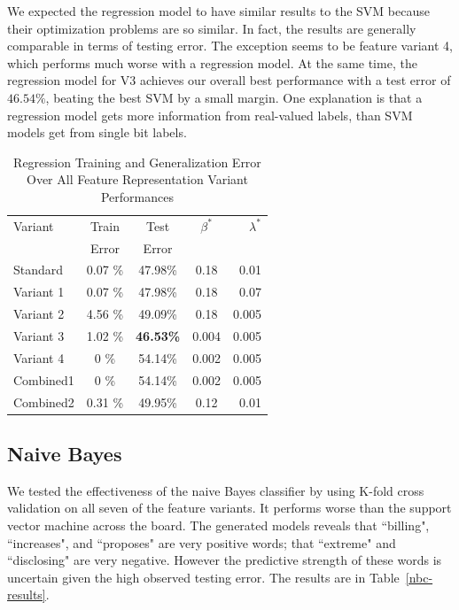 \documentclass{article}
\begin{document}
We expected the regression model to have similar results to the SVM because their optimization problems are so similar. In fact, the results are generally comparable in terms of testing error. The exception seems to be feature variant 4, which performs much worse with a regression model. At the same time, the regression model for V3 achieves our overall best performance with a test error of $46.54\%$, beating the best SVM by a small margin. One explanation is that a regression model gets more information from real-valued labels, than SVM models get from single bit labels.

\begin{table}[b]
\caption{Regression Training and Generalization Error Over All Feature Representation Variant Performances}
\label{reg-feature-experiment}
\vskip 0.15in
\begin{center}
\begin{small}
\begin{sc}
\begin{tabular}{lcccr}
\hline
\abovespace\belowspace
Variant & Train & Test & $\beta^*$ & $\lambda^*$ \\
\ & Error & Error \\
\hline
\abovespace
Standard     & 0.07 \% & 47.98\% & 0.18 & 0.01\\ %
Variant 1    & 0.07 \% & 47.98\% & 0.18 & 0.07\\ 
Variant 2    & 4.56 \% & 49.09\% & 0.18 & 0.005\\ 
Variant 3    & 1.02 \% & {\bf46.53\%} & 0.004 & 0.005\\ 
Variant 4    & 0 \% & 54.14\% & 0.002 & 0.005\\ 
Combined1    & 0 \% & 54.14\% & 0.002 & 0.005\\ 
\belowspace
Combined2    & 0.31 \% & 49.95\% & 0.12 & 0.01\\ 
\hline
\end{tabular}
\end{sc}
\end{small}
\end{center}
\vskip -0.1in
\end{table}


\subsection{Naive Bayes}
We tested the effectiveness of the naive Bayes classifier by using K-fold cross validation on all seven of the feature variants. It performs worse than the support vector machine across the board. The generated models reveals that ``billing", ``increases", and ``proposes" are very positive words; that ``extreme" and ``disclosing" are very negative. However the predictive strength of these words is uncertain given the high observed testing error. The results are in Table~\ref{nbc-results}.
\end{document}
